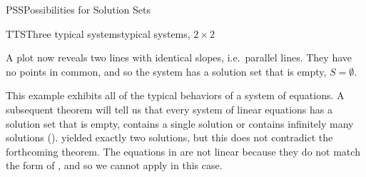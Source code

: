 \begin{subsect}{PSS}{Possibilities for Solution Sets}
\begin{example}{TTS}{Three typical systems}{typical systems, $2\times 2$}
%
\begin{para}A plot now reveals two lines with identical slopes, i.e.\ parallel lines.  They have no points in common, and so the system has a solution set that is empty, $S=\emptyset$.\end{para}
%
\end{example}
%
\begin{para}This example exhibits all of the typical behaviors of a system of equations.  A subsequent theorem will tell us that every system of linear equations has a solution set that is empty, contains a single solution or contains infinitely many solutions ().   yielded exactly two solutions, but this does not contradict the forthcoming theorem.  The equations in  are not linear because they do not match the form of , and so we cannot apply  in this case.\end{para}
%
\end{subsect}
%
